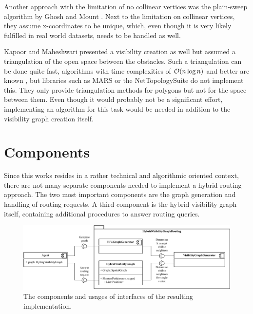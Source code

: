 			Another approach with the limitation of no collinear vertices was the plain-sweep algorithm by Ghosh and Mount \cite{ghosh-output-sensitive-vgraph}.
			Next to the limitation on collinear vertices, they assume x-coordinates to be unique, which, even though it is very likely fulfilled in real world datasets, needs to be handled as well.
			
			Kapoor and Maheshwari presented a visibility creation as well \cite{kapoor-shortest-path-vgraph} but assumed a triangulation of the open space between the obstacles.
			Such a triangulation can be done quite fast, algorithms with time complexities of $\mathcal{O}(n \log{n})$ and better are known \cite[58-60]{de-berg-computational-geometry}, but libraries such as MARS or the NetTopologySuite do not implement this.
			They only provide triangulation methods for polygons but not for the space between them.
			Even though it would probably not be a significant effort, implementing an algorithm for this task would be needed in addition to the visibility graph creation itself.
	
\section{Components}
\label{sec:components}

	Since this works resides in a rather technical and algorithmic oriented context, there are not many separate components needed to implement a hybrid routing approach.
	The two most important components are the graph generation and handling of routing requests.
	A third component is the hybrid visibility graph itself, containing additional procedures to answer routing queries.
	
	\begin{figure}[h]
		\begin{figcenter}
			\includegraphics[width=\textwidth]{images/components.pdf}
		\end{figcenter}
		\caption{The components and usages of interfaces of the resulting implementation.}
		\label{fig:components}
	\end{figure}
	
